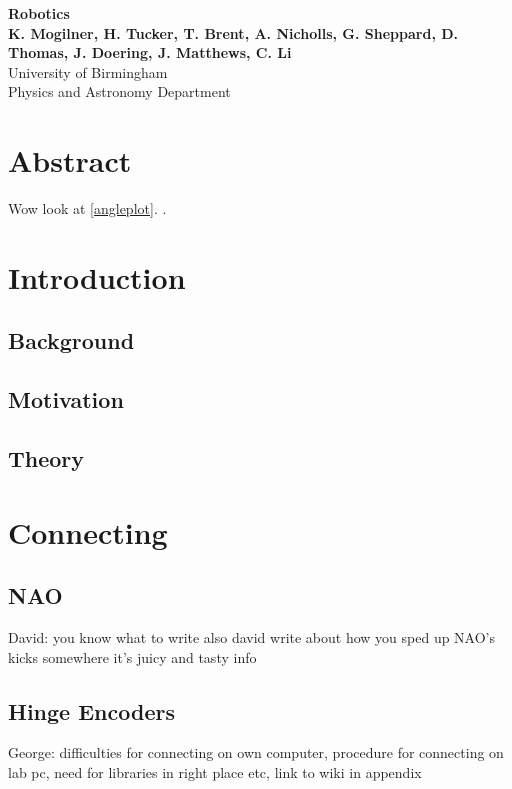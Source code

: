 \documentclass[11pt]{article}
\begin{document}
\begin{titlepage}

    \begin{center}
        \vspace*{1cm}
        \Huge
        \textbf{Robotics} \\
        \vspace{0.5cm}
        \LARGE
        \vspace{1.5cm}
        \textbf{K. Mogilner, H. Tucker, T. Brent, A. Nicholls, G. Sheppard, D. Thomas, J. Doering, J. Matthews, C. Li} \\
        \vfill
        \vspace{0.8cm}
        \Large
        University of Birmingham\\
        Physics and Astronomy Department\\
    \end{center}
\end{titlepage}

\tableofcontents

\section{Abstract}
Wow look at \ref{angleplot}. \cite{Bae2006}.

\section{Introduction}
\subsection{Background}
\subsection{Motivation}
\subsection{Theory}

\section{Connecting}
\subsection{NAO}
David: you know what to write
also david write about how you sped up NAO's kicks somewhere it's juicy and tasty info
\subsection{Hinge Encoders}
George: difficulties for connecting on own computer, procedure for connecting on lab pc, need for libraries in right place etc, link to wiki in appendix
\end{document}
